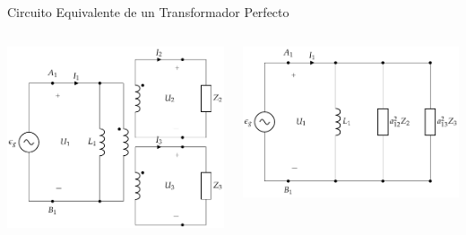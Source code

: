 \documentclass[aspectratio=169, usenames,svgnames,dvipsnames]{beamer}
\begin{document}
\begin{frame}[label={sec:org0f4d99f}]{Circuito Equivalente de un Transformador Perfecto}
\begin{columns}
\begin{column}{0.5\columnwidth}
\begin{center}
\includegraphics[width=\textwidth]{../figs/TrafoPerfectoIdealVariosDevanados_Impedancia.pdf}
\end{center}
\end{column}

\begin{column}{0.5\columnwidth}
\begin{center}
\includegraphics[width=\textwidth]{../figs/TrafoPerfectoVariosDevanados_Impedancia_Equivalente.pdf}
\end{center}
\end{column}
\end{columns}
\end{frame}
\end{document}
